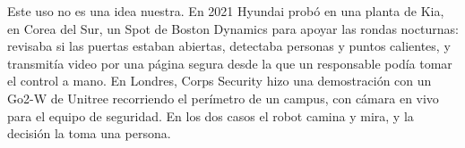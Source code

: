 Este uso no es una idea nuestra. En 2021 Hyundai probó en una planta de Kia, en Corea del Sur, un Spot de Boston Dynamics para apoyar las rondas nocturnas: revisaba si las puertas estaban abiertas, detectaba personas y puntos calientes, y transmitía video por una página segura desde la que un responsable podía tomar el control a mano. En Londres, Corps Security hizo una demostración con un Go2-W de Unitree recorriendo el perímetro de un campus, con cámara en vivo para el equipo de seguridad. En los dos casos el robot camina y mira, y la decisión la toma una persona.
